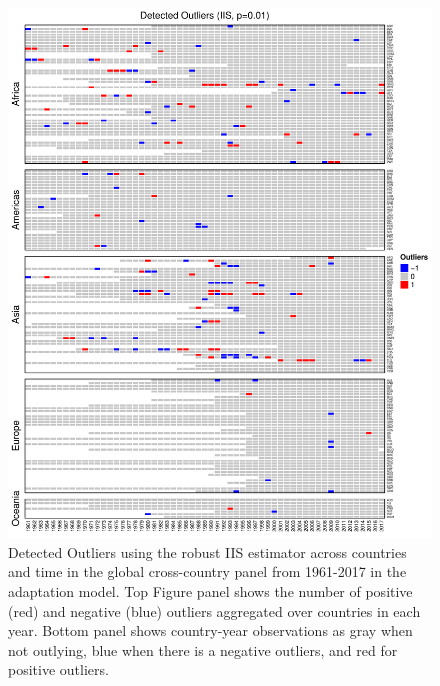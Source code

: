 \documentclass[11pt, letterpaper]{article}
\numberwithin{algorithm}{section}
\numberwithin{assumption}{section}
\numberwithin{lemma}{section}
\numberwithin{theorem}{section}
\numberwithin{corollary}{section}
\numberwithin{remark}{section}
\numberwithin{equation}{section}
\numberwithin{figure}{section}
\numberwithin{table}{section}
\begin{document}
\begin{figure}[!htbp]  %
\centering
\includegraphics[width = \textwidth]{heat1_adapt.pdf}
\caption{Detected Outliers using the robust IIS estimator across countries and time in the global cross-country panel from 1961-2017 in the adaptation model. Top Figure panel shows the number of positive (red) and negative (blue) outliers aggregated over countries in each year. Bottom panel shows country-year observations as gray when not outlying, blue when there is a negative outliers, and red for positive outliers.}
\label{fig_out_app1}
\end{figure}
\end{document}
